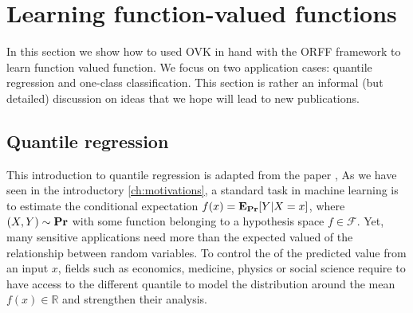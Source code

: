 \section{Learning function-valued functions}
In this section we show how to used \acs{OVK} in hand with the \acs{ORFF}
framework to learn function valued function. We focus on two application cases:
quantile regression and one-class classification. This section is rather an
informal (but detailed) discussion on ideas that we hope will lead to new
publications.
\subsection{Quantile regression}
\label{subsec:quantile_regression}
This introduction to quantile regression is adapted from the paper
\citet{sangnier2016joint}, As we have seen in the introductory
\cref{ch:motivations}, a standard task in machine learning is to estimate the
conditional expectation $f(x)={\mathbf{{E}}}_{{\mathbf{{Pr}}}}[Y | X = x]$, where
$(X,Y)\sim{\mathbf{{Pr}}}$ with some function belonging to a hypothesis space
$f\in\mathcal{F}$. Yet, many sensitive applications need more than the expected
valued of the relationship between random variables. To control the
 of the predicted value from an input $x$, fields such as
economics, medicine, physics or social science require to have access to the
different quantile to model the distribution around the mean
$f(x)\in\mathbb{R}$ and strengthen their analysis.
